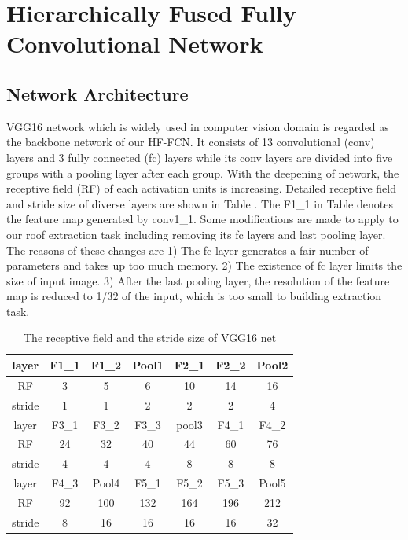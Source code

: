 \section{Hierarchically Fused Fully Convolutional Network}
\label{Sec:HF-FCN}
\subsection{Network Architecture}
 VGG16 network which is widely used in computer vision domain is regarded as the backbone network of our HF-FCN. It consists of 13 convolutional (conv) layers and 3 fully connected (fc) layers while its conv layers are divided into five groups with a pooling layer after each group. With the deepening of network, the receptive field (RF) of each activation units is increasing. Detailed receptive field and stride size of diverse layers are shown in Table . The F1\_1 in Table  denotes the feature map generated by conv1\_1. Some modifications are made to apply to our roof extraction task including removing its fc layers and last pooling layer. The reasons of these changes are 1) The fc layer generates a fair number of parameters and takes up too much memory. 2) The existence of fc layer limits the size of input image. 3) After the last pooling layer, the resolution of the feature map is reduced to 1/32 of the input, which is too small to building extraction task.\par
\begin{table}[!h!b!p]
\centering
\caption{The receptive field and the stride size of VGG16 net}

\begin{tabular}{c||cccccc}
\hline
layer &F1\_1 &F1\_2 & Pool1 &F2\_1 &F2\_2 &Pool2 \\ \hline
RF &3&5&6&10&14&16\\ \hline
stride &1 &1 &2 &2 &2 & 4\\ \hline\hline
layer &F3\_1 &F3\_2 & F3\_3 &pool3 &F4\_1&F4\_2\\ \hline
RF &24&32&40&44&60&76\\ \hline
stride &4 &4 &4 &8 &8 &8\\ \hline\hline
layer &F4\_3&Pool4 &F5\_1 &F5\_2 &F5\_3& Pool5 \\ \hline
RF &92 &100 &132 &164 &196 &212 \\ \hline
stride &8 &16 &16 &16 &16 &32\\ \hline
\end{tabular}
\end{table}
